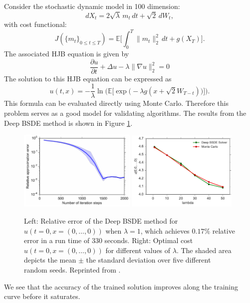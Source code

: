 \documentclass[12pt,AutoFakeBold,AutoFakeSlant]{article}
\theoremstyle{definition}
\newcommand{\E}{\mathbb{E}}
\begin{document}
	Consider the stochastic dynamic model in 100 dimension:
	\begin{equation}
				dX_t = 2\sqrt{\lambda}\,m_t\,dt+\sqrt{2}\,dW_t,
	\end{equation}
	with cost functional:
	\begin{equation}
	J( \{ m_t \}_{ 0 \leq t \leq T } ) =
			\E\big[
				\int_0^T \|m_t\|_2^2 \, dt + g(X_T)
			\big].
	\end{equation}
			The associated HJB equation is given by
			\begin{equation}
		\frac{ \partial u}{ \partial t } + \Delta u  - \lambda \|\nabla u \|_2^2 = 0
			\end{equation}
			The solution to this HJB equation can be expressed as
	\begin{equation}
					u(t,x) = - \frac{ 1}{ \lambda }
					\ln\!\bigg(
						\E\Big[
						\exp\!\Big(
							- \lambda g( x + \sqrt{ 2 }W_{ T - t }  )
						\Big)
						\Big]
					\bigg).
					\end{equation}
					This formula can be evaluated directly using Monte Carlo. Therefore this problem serves as a good model
					for validating algorithms. The results from the Deep BSDE method is shown in Figure \ref{fig:LQR}.
	\begin{figure}[H]
		\centering
		\includegraphics[width=0.5\textwidth]{./figs/SquareGradient_d100_Relative_approximation_error}
		\includegraphics[width=0.47\textwidth]{./figs/HJB_parameter}
		\caption{Left: Relative error of the Deep BSDE method for $ u( t{=}0, x{=}(0,\dots,0) )$ when $ \lambda = 1 $,
		which achieves $ 0.17\% $ relative error in a run time of 330 seconds. 
		Right: Optimal cost $u(t{=}0,x{=}(0,\dots,0))$ for different values of $\lambda$.
		The shaded area depicts the mean $\pm$ the standard deviation over five different random seeds. 
		Reprinted from \cite{HanJentzenE2018}.
		}
		\label{fig:LQR}
	\end{figure}
	We see that the accuracy of the trained solution improves along the training curve before it saturates.
\end{document}

